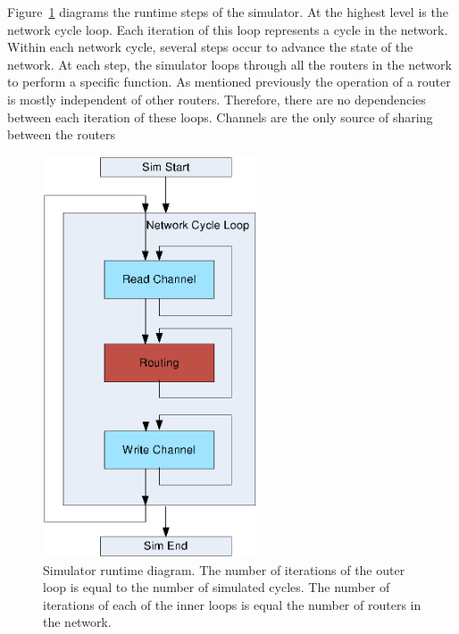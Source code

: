 Figure~\ref{fig:runtime} diagrams the runtime steps of the simulator. At the highest level is the network cycle loop. Each iteration of this loop represents a cycle in the network. Within each network cycle, several steps occur to advance the state of the network. At each step, the simulator loops through all the routers in the network to perform a specific function. As mentioned previously the operation of a router is mostly independent of other routers. Therefore, there are no dependencies between each iteration of these loops. Channels are the only source of sharing between the routers 
\begin{figure}[t]
\centering
\includegraphics[width=2.5in]{runtime.eps}
\caption{Simulator runtime diagram. The number of iterations of the outer loop is equal to the number of simulated cycles. The number of iterations of each of the inner loops is equal the number of routers in the network.}
\label{fig:runtime}
\end{figure}
